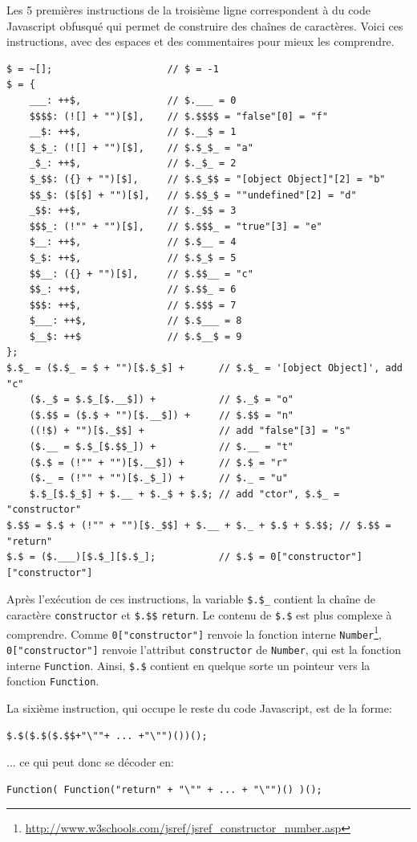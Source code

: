 \documentclass[a4paper,10pt]{article}
\begin{document}
Les 5 premières instructions de la troisième ligne correspondent à du code Javascript obfusqué qui permet de construire des chaînes de caractères.
Voici ces instructions, avec des espaces et des commentaires pour mieux les comprendre.
\begin{verbatim}
$ = ~[];                    // $ = -1
$ = {
    ___: ++$,               // $.___ = 0
    $$$$: (![] + "")[$],    // $.$$$$ = "false"[0] = "f"
    __$: ++$,               // $.__$ = 1
    $_$_: (![] + "")[$],    // $.$_$_ = "a"
    _$_: ++$,               // $._$_ = 2
    $_$$: ({} + "")[$],     // $.$_$$ = "[object Object]"[2] = "b"
    $$_$: ($[$] + "")[$],   // $.$$_$ = ""undefined"[2] = "d"
    _$$: ++$,               // $._$$ = 3
    $$$_: (!"" + "")[$],    // $.$$$_ = "true"[3] = "e"
    $__: ++$,               // $.$__ = 4
    $_$: ++$,               // $.$_$ = 5
    $$__: ({} + "")[$],     // $.$$__ = "c"
    $$_: ++$,               // $.$$_ = 6
    $$$: ++$,               // $.$$$ = 7
    $___: ++$,              // $.$___ = 8
    $__$: ++$               // $.$__$ = 9
};
$.$_ = ($.$_ = $ + "")[$.$_$] +      // $.$_ = '[object Object]', add "c"
    ($._$ = $.$_[$.__$]) +           // $._$ = "o"
    ($.$$ = ($.$ + "")[$.__$]) +     // $.$$ = "n"
    ((!$) + "")[$._$$] +             // add "false"[3] = "s"
    ($.__ = $.$_[$.$$_]) +           // $.__ = "t"
    ($.$ = (!"" + "")[$.__$]) +      // $.$ = "r"
    ($._ = (!"" + "")[$._$_]) +      // $._ = "u"
    $.$_[$.$_$] + $.__ + $._$ + $.$; // add "ctor", $.$_ = "constructor"
$.$$ = $.$ + (!"" + "")[$._$$] + $.__ + $._ + $.$ + $.$$; // $.$$ = "return"
$.$ = ($.___)[$.$_][$.$_];           // $.$ = 0["constructor"]["constructor"]
\end{verbatim}

Après l'exécution de ces instructions, la variable \texttt{\$.\$\_} contient la chaîne de caractère \texttt{constructor} et \texttt{\$.\$\$} \texttt{return}.
Le contenu de \texttt{\$.\$} est plus complexe à comprendre.
Comme \texttt{0["constructor"]} renvoie la fonction interne \texttt{Number}\footnote{\url{http://www.w3schools.com/jsref/jsref_constructor_number.asp}}, \texttt{0["constructor"]} renvoie l'attribut \texttt{constructor} de \texttt{Number}, qui est la fonction interne \texttt{Function}.
Ainsi, \texttt{\$.\$} contient en quelque sorte un pointeur vers la fonction \texttt{Function}.

La sixième instruction, qui occupe le reste du code Javascript, est de la forme:
\begin{verbatim}
$.$($.$($.$$+"\""+ ... +"\"")())();
\end{verbatim}
... ce qui peut donc se décoder en:
\begin{verbatim}
Function( Function("return" + "\"" + ... + "\"")() )();
\end{verbatim}
\end{document}
